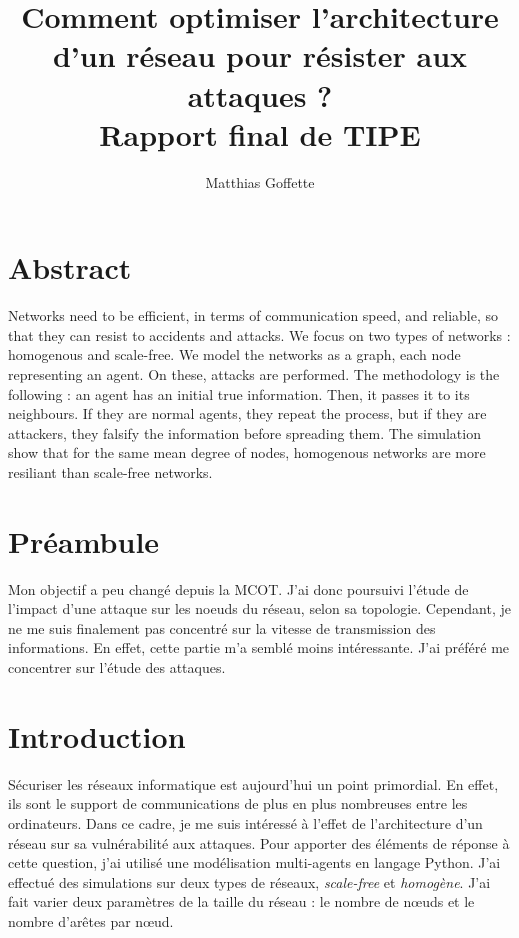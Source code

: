 \documentclass[12pt,a4paper]{article}
\title{Comment optimiser l'architecture d'un réseau pour résister aux attaques ?\\
  Rapport final de TIPE}
\author{Matthias Goffette}
\begin{document}
\maketitle

\section{Abstract} %

	Networks need to be efficient, in terms of communication speed, and reliable, so that they can resist to accidents and attacks. We focus on two types of networks : homogenous and scale-free. We model the networks as a graph, each node representing an agent. On these, attacks are performed. The methodology is the following : an agent has an initial true information. Then, it passes it to its neighbours. If they are normal agents, they repeat the process, but if they are attackers, they falsify the information before spreading them. The simulation show that for the same mean degree of nodes, homogenous networks are more resiliant than scale-free networks.



\section{Préambule} %

Mon objectif a peu changé depuis la MCOT.
J'ai donc poursuivi l'étude de l'impact d'une attaque sur les noeuds du réseau, selon sa topologie.
Cependant, je ne me suis finalement pas concentré sur la vitesse de transmission des informations.
En effet, cette partie m'a semblé moins intéressante.
J'ai préféré me concentrer sur l'étude des attaques.


\section{Introduction} %


Sécuriser les réseaux informatique est aujourd'hui un point primordial.
En effet, ils sont le support de communications de plus en plus nombreuses entre les ordinateurs.
Dans ce cadre, je me suis intéressé à l'effet de l'architecture d'un réseau sur sa vulnérabilité aux attaques.
Pour apporter des éléments de réponse à cette question, j'ai utilisé une modélisation multi-agents en langage Python.
J'ai effectué des simulations sur deux types de réseaux, \emph{scale-free} et \emph{homogène}.
J'ai fait varier deux paramètres de la taille du réseau : le nombre de nœuds et le nombre d'arêtes par nœud.  
\end{document}
